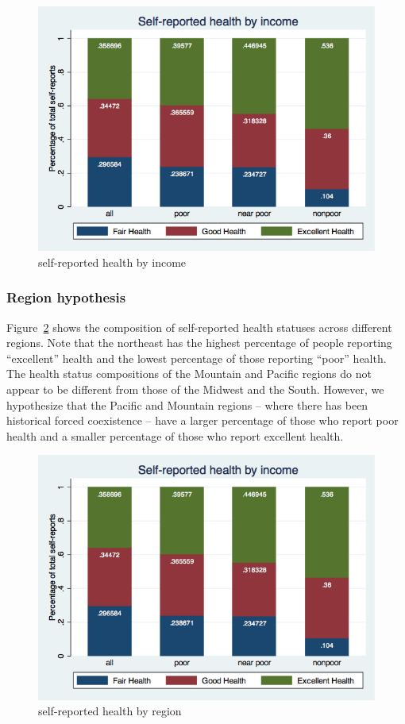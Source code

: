 \documentclass[12pt]{article}
\begin{document}
\begin{figure}[ht!]
\centering
\includegraphics[scale=0.3]{health_status_by_income.png}
\caption{self-reported health by income}
\label{fig:health_status_by_income}
\end{figure}

\subsubsection{Region hypothesis}
Figure~\ref{fig:health_status_by_region} shows the composition of self-reported health statuses across different regions. 
Note that the northeast has the highest percentage of people reporting ``excellent'' health and the lowest percentage of those reporting ``poor'' health.
The health status compositions of the Mountain and Pacific regions do not appear to be different from those of the Midwest and the South. 
However, we hypothesize that the Pacific and Mountain regions -- where there has been historical forced coexistence -- have a larger percentage of those who report poor health and a smaller percentage of those who report excellent health.

\begin{figure}[ht!]
\centering
\includegraphics[scale=0.3]{health_status_by_income.png}
\caption{self-reported health by region}
\label{fig:health_status_by_region}
\end{figure}
\end{document}
